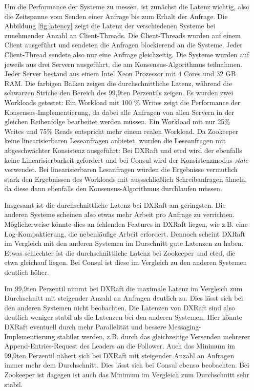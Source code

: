 Um die Performance der Systeme zu messen, ist zunächst die Latenz wichtig, also die Zeitspanne vom Senden einer Anfrage bis zum Erhalt der Anfrage. Die Abbildung \ref{fig:latency} zeigt die Latenz der verschiedenen Systeme bei zunehmender Anzahl an Client-Threads. Die Client-Threads wurden auf einem Client ausgeführt und sendeten die Anfragen blockierend an die Systeme. Jeder Client-Thread sendete also nur eine Anfrage gleichzeitig. Die Systeme wurden auf jeweils aus drei Servern ausgeführt, die am Konsensus-Algorithmus teilnahmen. Jeder Server bestand aus einem Intel Xeon Prozessor mit 4 Cores und 32 GB RAM. Die farbigen Balken zeigen die durchschnittliche Latenz, während die schwarzen Striche den Bereich des 99,9ten Perzentils zeigen. Es wurden zwei Workloads getestet: Ein Workload mit 100 \% Writes zeigt die Performance der Konsensus-Implementierung, da dabei alle Anfragen von allen Servern in der gleichen Reihenfolge bearbeitet werden müssen. Ein Workload mit nur 25\% Writes und 75\% Reads entspricht mehr einem realen Workload. Da Zookeeper keine linearisierbaren Leseanfragen anbietet, wurden die Leseanfragen mit abgeschwächter Konsistenz ausgeführt: Bei DXRaft und etcd wird der ebenfalls keine Linearisierbarkeit gefordert und bei Consul wird der Konsistenzmodus \textit{stale} verwendet. Bei linearisierbaren Lesanfragen würden die Ergebnisse vermutlich stark den Ergebnissen des Workloads mit aussschließlich Schreibanfragen ähneln, da diese dann ebenfalls den Konsensus-Algorithmus durchlaufen müssen.

Insgesamt ist die durchschnittliche Latenz bei DXRaft am geringsten. Die anderen Systeme scheinen also etwas mehr Arbeit pro Anfrage zu verrichten. Möglicherweise könnte dies an fehlenden Features in DXRaft liegen, wie z.B. eine Log-Kompaktierung, die nebenläufige Arbeit erfordert. Dennoch scheint DXRaft im Vergleich mit den anderen Systemen im Durschnitt gute Latenzen zu haben. Etwas schlechter ist die durchschnittliche Latenz bei Zookeeper und etcd, die etwa gleichauf liegen. Bei Consul ist diese im Vergleich zu den anderen Systemen deutlich höher.

Im 99,9ten Perzentil nimmt bei DXRaft die maximale Latenz im Vergleich zum Durchschnitt mit steigender Anzahl an Anfragen deutlich zu. Dies lässt sich bei den anderen Systemen nicht beobachten. Die Latenzen von DXRaft sind also deutlich weniger stabil als die Latenzen bei den anderen Systemen. Hier könnte DXRaft eventuell durch mehr Parallelität und bessere Messaging-Implementierung stabiler werden, z.B. durch das gleichzeitige Versenden mehrerer Append-Entries-Request des Leaders an die Follower. Auch das Minimum im 99,9ten Perzentil nähert sich bei DXRaft mit steigender Anzahl an Anfragen immer mehr dem Durchschnitt. Dies lässt sich bei Consul ebenso beobachten. Bei Zookeeper ist dagegen ist auch das Minimum im Vergleich zum Durchschnitt sehr stabil.

